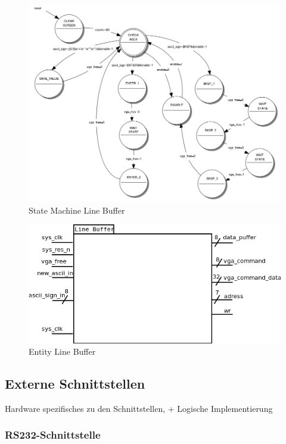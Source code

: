 \begin{figure}[!ht]
	\centering
	\includegraphics[scale=0.40]{figures/line_buffer.png} 
	\caption{State Machine Line Buffer}
	\label{fig:fsm_lb}
\end{figure}

\begin{figure}[!ht]
	\centering
	\includegraphics[scale=0.5]{figures/entity_puffer.png} 
	\caption{Entity Line Buffer}
	\label{fig:entity_buffer}
\end{figure}


\subsection{Externe Schnittstellen}

Hardware spezifisches zu den Schnittstellen, + Logische Implementierung

\subsubsection{RS232-Schnittstelle}


